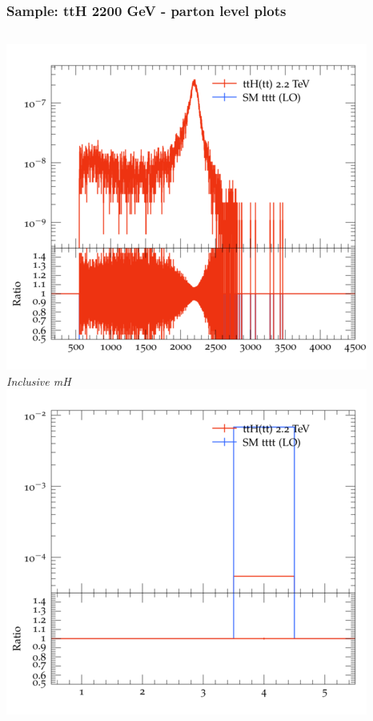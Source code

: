 \documentclass{beamer}
\begin{document}
\begin{frame}
\frametitle{Sample: ttH 2200 GeV - parton level plots}
\begin{columns}
\includegraphics[width=\textwidth]{../plots/ttH_2200/tttt_ttH/Inclusive_mH.png}\\
\textit{\small Inclusive mH}
\includegraphics[width=\textwidth]{../plots/ttH_2200/tttt_ttH/Inclusive_nTop.png}\\

\end{columns}
\end{frame}
\end{document}
